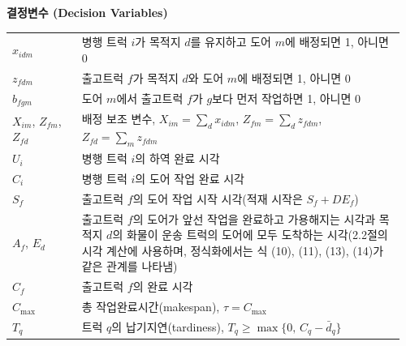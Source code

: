 \documentclass[10pt,a4paper]{article}
\begin{document}
\begin{table}[H]
{\begin{minipage}{0.94\columnwidth}
\medskip
\noindent\textbf{결정변수 (Decision Variables)}\\[1mm]
\begin{tabular}{@{}p{0.17\linewidth}p{0.79\linewidth}@{}}
$x_{idm}$ & 병행 트럭 $i$가 목적지 $d$를 유지하고 도어 $m$에 배정되면 1, 아니면 0 \\
$z_{fdm}$ & 출고트럭 $f$가 목적지 $d$와 도어 $m$에 배정되면 1, 아니면 0 \\
$b_{fgm}$ & 도어 $m$에서 출고트럭 $f$가 $g$보다 먼저 작업하면 1, 아니면 0 \\
$X_{im}$, $Z_{fm}$, $Z_{fd}$ & 배정 보조 변수, $X_{im}=\sum_d x_{idm}$, $Z_{fm}=\sum_d z_{fdm}$, $Z_{fd}=\sum_m z_{fdm}$ \\
$U_i$ & 병행 트럭 $i$의 하역 완료 시각 \\
$C_i$ & 병행 트럭 $i$의 도어 작업 완료 시각 \\
$S_f$ & 출고트럭 $f$의 도어 작업 시작 시각(적재 시작은 $S_f+DE_f$) \\
$A_f$, $E_d$ & 출고트럭 $f$의 도어가 앞선 작업을 완료하고 가용해지는 시각과 목적지 $d$의 화물이 운송 트럭의 도어에 모두 도착하는 시각(2.2절의 시각 계산에 사용하며, 정식화에서는 식 (10), (11), (13), (14)가 같은 관계를 나타냄) \\
$C_f$ & 출고트럭 $f$의 완료 시각 \\
$C_{\max}$ & 총 작업완료시간(makespan), $\tau=C_{\max}$ \\
$T_q$ & 트럭 $q$의 납기지연(tardiness), $T_q\ge\max\{0,\,C_q-\bar d_q\}$ \\
\end{tabular}
\end{minipage}}
\end{table}
\end{document}
